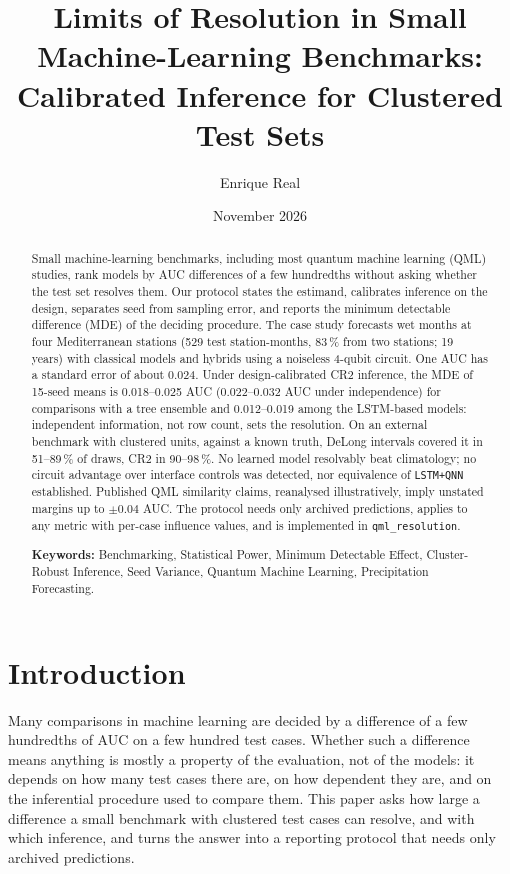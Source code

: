 \documentclass[11pt,a4paper]{article}
\title{\textbf{Limits of Resolution in Small Machine-Learning Benchmarks: Calibrated Inference for Clustered Test Sets}}
\author[1,*]{Enrique Real}
\affil[1]{Independent Researcher, Alicante, Spain. ORCID: \href{https://orcid.org/0009-0006-3862-9797}{0009-0006-3862-9797}}
\affil[*]{\textit{Corresponding author: enriquerb32@gmail.com}}
\date{November 2026}
\begin{document}
\maketitle
\linenumbers


\begin{abstract}
Small machine-learning benchmarks, including most quantum machine learning (QML) studies, rank models by AUC differences of a few hundredths without asking whether the test set resolves them. Our protocol states the estimand, calibrates inference on the design, separates seed from sampling error, and reports the minimum detectable difference (MDE) of the deciding procedure. The case study forecasts wet months at four Mediterranean stations (529 test station-months, 83\,\% from two stations; 19 years) with classical models and hybrids using a noiseless 4-qubit circuit. One AUC has a standard error of about 0.024. Under design-calibrated CR2 inference, the MDE of 15-seed means is 0.018--0.025 AUC (0.022--0.032 AUC under independence) for comparisons with a tree ensemble and 0.012--0.019 among the LSTM-based models: independent information, not row count, sets the resolution. On an external benchmark with clustered units, against a known truth, DeLong intervals covered it in 51--89\,\% of draws, CR2 in 90--98\,\%. No learned model resolvably beat climatology; no circuit advantage over interface controls was detected, nor equivalence of \texttt{LSTM+QNN} established. Published QML similarity claims, reanalysed illustratively, imply unstated margins up to $\pm0.04$ AUC. The protocol needs only archived predictions, applies to any metric with per-case influence values, and is implemented in \texttt{qml\_resolution}.

\bigskip

\noindent \textbf{Keywords:} Benchmarking, Statistical Power, Minimum Detectable Effect, Cluster-Robust Inference, Seed Variance, Quantum Machine Learning, Precipitation Forecasting.
\end{abstract}

\newpage

\section{Introduction}

Many comparisons in machine learning are decided by a difference of a few hundredths of AUC on a few hundred test cases. Whether such a difference means anything is mostly a property of the evaluation, not of the models: it depends on how many test cases there are, on how dependent they are, and on the inferential procedure used to compare them. This paper asks how large a difference a small benchmark with clustered test cases can resolve, and with which inference, and turns the answer into a reporting protocol that needs only archived predictions.
\end{document}
